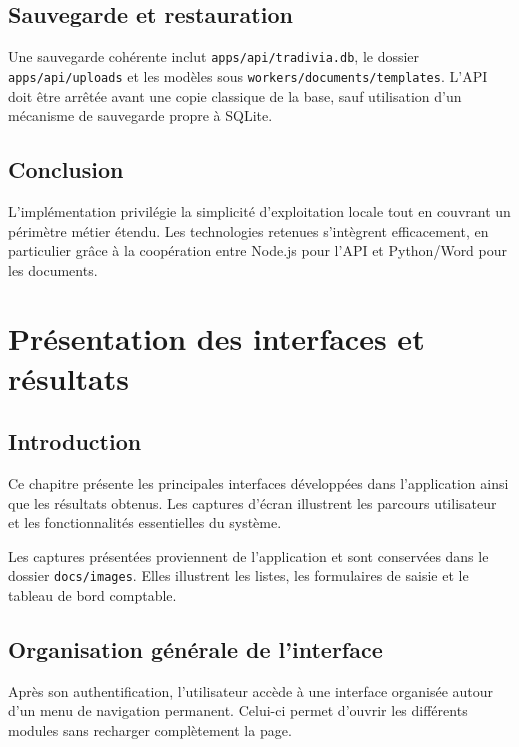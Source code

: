 \documentclass[12pt,a4paper,oneside]{report}
\newcommand{\code}[1]{\texttt{#1}}
\newif\ifshowmissingfigures
\begin{document}
\section{Sauvegarde et restauration}
Une sauvegarde cohérente inclut \code{apps/api/tradivia.db}, le dossier \code{apps/api/uploads} et les modèles sous \code{workers/documents/templates}. L'API doit être arrêtée avant une copie classique de la base, sauf utilisation d'un mécanisme de sauvegarde propre à SQLite.

\section*{Conclusion}
L'implémentation privilégie la simplicité d'exploitation locale tout en couvrant un périmètre métier étendu. Les technologies retenues s'intègrent efficacement, en particulier grâce à la coopération entre Node.js pour l'API et Python/Word pour les documents.

\chapter{Présentation des interfaces et résultats}
\label{chap:interfaces}
\showmissingfiguresfalse

\section*{Introduction}

Ce chapitre présente les principales interfaces développées dans
l'application ainsi que les résultats obtenus. Les captures d'écran
illustrent les parcours utilisateur et les fonctionnalités essentielles
du système.

Les captures présentées proviennent de l’application et sont conservées dans le dossier \code{docs/images}. Elles illustrent les listes, les formulaires de saisie et le tableau de bord comptable.

\section{Organisation générale de l'interface}

Après son authentification, l'utilisateur accède à une interface organisée
autour d'un menu de navigation permanent. Celui-ci permet d'ouvrir les
différents modules sans recharger complètement la page.
\end{document}
